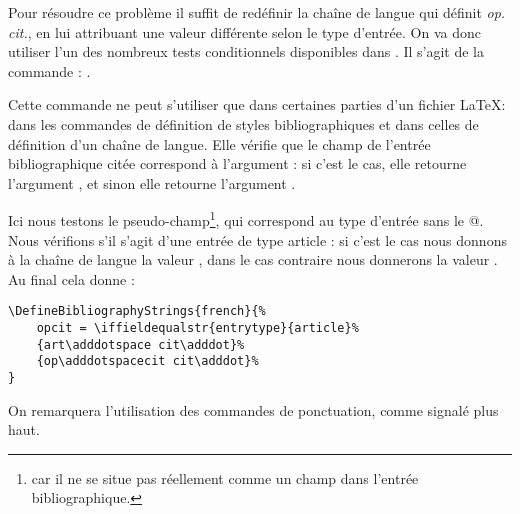 Pour résoudre ce problème il suffit de redéfinir la chaîne de langue qui définit \emph{op. cit.}, en lui attribuant une valeur différente selon le type d'entrée.  On va donc utiliser l'un des nombreux tests conditionnels disponibles dans . Il s'agit de la commande : .

Cette commande ne peut s'utiliser que dans certaines parties d'un fichier \LaTeX : dans les commandes de définition de styles bibliographiques et  dans celles de définition d'un chaîne de langue. 
Elle vérifie que le champ 	de l'entrée bibliographique citée correspond à l'argument : si c'est le cas, elle retourne l'argument , et sinon elle retourne l'argument .

Ici nous testons le pseudo-champ\footnote{ car il ne se situe pas réellement comme un champ dans l'entrée bibliographique.}, qui correspond au type d'entrée sans le @. Nous vérifions  s'il s'agit d'une entrée de type article : si c'est le cas nous donnons à la chaîne de langue la valeur  ,  dans le cas contraire nous donnerons la valeur .
Au final cela donne : 

\begin{verbatim}
\DefineBibliographyStrings{french}{%
	opcit = \iffieldequalstr{entrytype}{article}%
	{art\adddotspace cit\adddot}%
	{op\adddotspacecit cit\adddot}%
}
\end{verbatim}

On remarquera l'utilisation des commandes de ponctuation, comme signalé plus haut.



	
